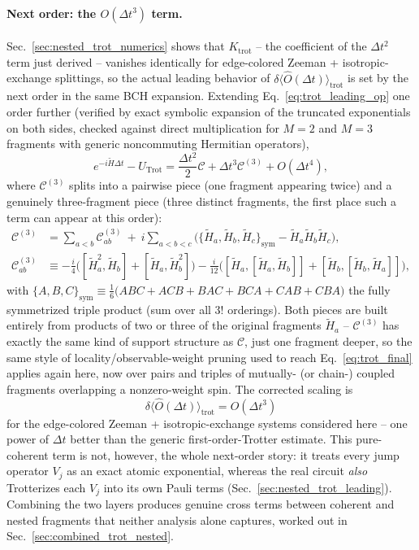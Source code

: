 \documentclass[11pt]{article}
\newcommand{\Dt}{\Delta t}
\newcommand{\calC}{\mathcal{C}}
\begin{document}
\paragraph{Next order: the \texorpdfstring{$O(\Dt^3)$}{O(Dt\^{}3)} term.} Sec.~\ref{sec:nested_trot_numerics} shows that $K_{\text{trot}}$ -- the coefficient of the $\Dt^2$ term just derived -- vanishes identically for edge-colored Zeeman + isotropic-exchange splittings, so the actual leading behavior of $\delta\langle\hat{O}(\Dt)\rangle_{\text{trot}}$ is set by the next order in the same BCH expansion. Extending Eq.~\eqref{eq:trot_leading_op} one order further (verified by exact symbolic expansion of the truncated exponentials on both sides, checked against direct multiplication for $M=2$ and $M=3$ fragments with generic noncommuting Hermitian operators),
\begin{equation}\label{eq:trot_third_order}
    e^{-i\tilde{H}\Dt} - U_{\text{Trot}} = \frac{\Dt^2}{2}\calC + \Dt^3\calC^{(3)} + O(\Dt^4),
\end{equation}
where $\calC^{(3)}$ splits into a pairwise piece (one fragment appearing twice) and a genuinely three-fragment piece (three distinct fragments, the first place such a term can appear at this order):
\begin{align}
    \calC^{(3)} &= \sum_{a<b}\calC^{(3)}_{ab} \ +\ i\!\!\sum_{a<b<c}\!\Big(\{\tilde{H}_a,\tilde{H}_b,\tilde{H}_c\}_{\text{sym}} - \tilde{H}_a\tilde{H}_b\tilde{H}_c\Big),\label{eq:C3_split}\\
    \calC^{(3)}_{ab} &\equiv -\frac{i}{4}\Big([\tilde{H}_a^2,\tilde{H}_b]+[\tilde{H}_a,\tilde{H}_b^2]\Big) - \frac{i}{12}\Big([\tilde{H}_a,[\tilde{H}_a,\tilde{H}_b]]+[\tilde{H}_b,[\tilde{H}_b,\tilde{H}_a]]\Big),\label{eq:C3_pair}
\end{align}
with $\{A,B,C\}_{\text{sym}}\equiv\frac16\big(ABC+ACB+BAC+BCA+CAB+CBA\big)$ the fully symmetrized triple product (sum over all $3!$ orderings). Both pieces are built entirely from products of two or three of the original fragments $\tilde{H}_a$ -- $\calC^{(3)}$ has exactly the same kind of support structure as $\calC$, just one fragment deeper, so the same style of locality/observable-weight pruning used to reach Eq.~\eqref{eq:trot_final} applies again here, now over pairs and triples of mutually- (or chain-) coupled fragments overlapping a nonzero-weight spin. The corrected scaling is
\begin{equation}
    \delta\langle\hat{O}(\Dt)\rangle_{\text{trot}} = O(\Dt^3)
\end{equation}
for the edge-colored Zeeman + isotropic-exchange systems considered here -- one power of $\Dt$ better than the generic first-order-Trotter estimate. This pure-coherent term is not, however, the whole next-order story: it treats every jump operator $V_j$ as an exact atomic exponential, whereas the real circuit \emph{also} Trotterizes each $V_j$ into its own Pauli terms (Sec.~\ref{sec:nested_trot_leading}). Combining the two layers produces genuine cross terms between coherent and nested fragments that neither analysis alone captures, worked out in Sec.~\ref{sec:combined_trot_nested}.
\end{document}
